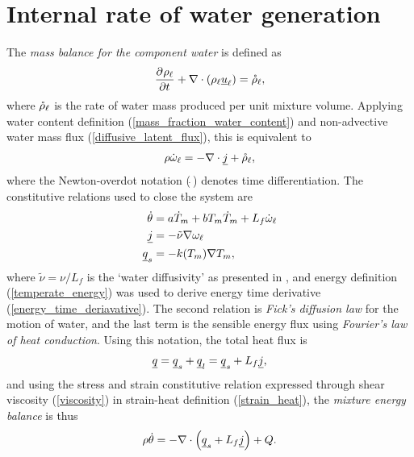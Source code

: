 \section{Internal rate of water generation}

The \emph{mass balance for the component water} is defined as
\begin{align*}
  \frac{\partial^{} \rho_{\mathrm{\ell}}}{\partial t^{} } + \nabla \cdot \left( \rho_{\mathrm{\ell}} \underline{u}_{\mathrm{\ell}} \right) = \mathring{\rho}_{\mathrm{\ell}},
\end{align*}
where $\mathring{\rho}_{\mathrm{\ell}}$ is the rate of water mass produced per unit mixture volume.  Applying water content definition (\ref{mass_fraction_water_content}) and non-advective water mass flux (\ref{diffusive_latent_flux}), this is equivalent to
\begin{align}
  \label{water_mass_balance}
  \rho \dot{\omega}_{\mathrm{\ell}} = - \nabla \cdot \underline{j} + \mathring{\rho}_{\mathrm{\ell}},
\end{align}
where the Newton-overdot notation ($\dot{\ }$) denotes time differentiation.  The constitutive relations used to close the system are
\begin{align}
  \label{energy_time_deriavative}
  \dot{\theta} &= a \dot{T}_m + b T_m \dot{T}_m + L_f \dot{\omega}_{\mathrm{\ell}} \\
  \label{water_fick_law}
  \underline{j} &= - \tilde{\nu} \nabla \omega_{\mathrm{\ell}} \\
  \label{temperate_sensible_energy}
  \underline{q}_s &= - k(T_m) \nabla T_m,
\end{align}
where $\tilde{\nu} = \nu / L_f$ is the `water diffusivity' as presented in \citet{greve_1997}, and energy definition (\ref{temperate_energy}) was used to derive energy time derivative (\ref{energy_time_deriavative}).  The second relation is \emph{Fick's diffusion law} for the motion of water, and the last term is the sensible energy flux using \emph{Fourier's law of heat conduction}.  Using this notation, the total heat flux is
\begin{align*}
  \underline{q} = \underline{q}_s + \underline{q}_l = \underline{q}_s + L_f \underline{j},
\end{align*}
and using the stress and strain constitutive relation expressed through shear viscosity (\ref{viscosity}) in strain-heat definition (\ref{strain_heat}), the \emph{mixture energy balance} is thus \citep{greve_2009}
\begin{align}
  \label{mixture_energy_balance}
  \rho \dot{\theta} = - \nabla \cdot \left( \underline{q}_s + L_f \underline{j} \right) + Q.
\end{align}
